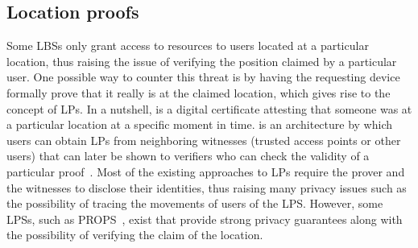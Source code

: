 \subsection{Location proofs}
\label{location-proofs}
Some \acp{LBS} only grant access to resources to users located at a particular 
location, thus raising the issue of verifying the position claimed by a 
particular user.
One possible way to counter this threat is by having the requesting device 
formally prove that it really is at the claimed location, which gives rise to 
the concept of \acp{LP}.
In a nutshell,  is a digital certificate attesting that someone was at 
a particular location at a specific moment in time.
 is an architecture by which users can obtain \acp{LP} from 
neighboring witnesses (\eg trusted access points or other users) that can later 
be shown to verifiers who can check the validity of a particular 
proof~\cite{luo2010veriplace,zhu2011applaus}.
Most of the existing approaches to \acp{LP} require the prover and the 
witnesses to disclose their identities, thus raising many privacy issues such 
as the possibility of tracing the movements of users of the \ac{LPS}.
However, some \acp{LPS}, such as PROPS~\cite{PROPS}, exist that provide strong 
privacy guarantees along with the possibility of verifying the claim of the 
location.

%
%
